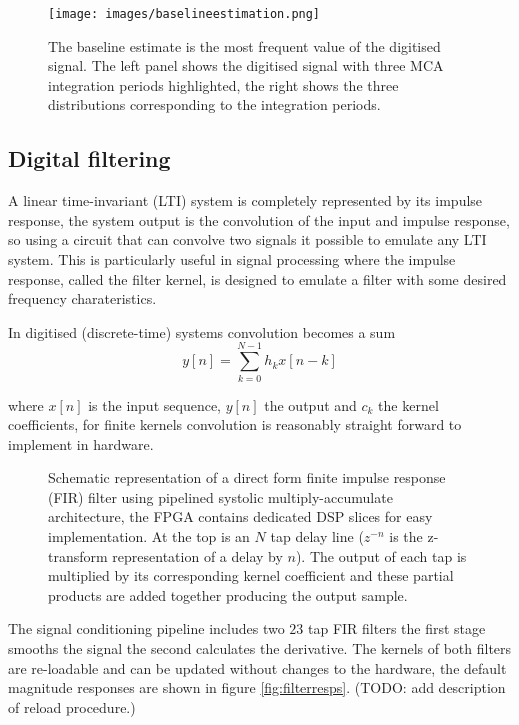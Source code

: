 \documentclass{article}
\begin{document}
\begin{figure}[!hpbt]
  \centering
  \texttt{[image: images/baselineestimation.png]}
  \caption{
    The baseline estimate is the most frequent value of the digitised signal.
    The left panel shows the digitised signal with three MCA integration periods
    highlighted, the right shows the three distributions corresponding to the
    integration periods.
  }
  \label{fig:baselineestimation}
\end{figure}

\clearpage

\subsection{Digital filtering}

A linear time-invariant (LTI) system is completely represented by its impulse
response, the system output is the convolution of the input and
impulse response, so using a circuit that can convolve two signals it possible
to emulate any LTI system. This is particularly useful in signal processing
where the impulse response, called the filter kernel, is designed to emulate a
filter with some desired frequency charateristics. 

In digitised (discrete-time) systems convolution becomes a sum
\begin{equation*}
  y[n]=\sum_{k=0}^{N-1}h_k x[n-k]
\end{equation*}
 
where $x[n]$ is the input sequence, $y[n]$ the output and $c_k$ the kernel
coefficients, for finite kernels convolution is reasonably straight
forward to implement in hardware.

\begin{figure}[!hpbt]
  \centering 
  
  \caption{
    Schematic representation of a direct form finite impulse response (FIR)
    filter using pipelined systolic multiply-accumulate architecture, the FPGA
    contains dedicated DSP slices for easy implementation.
    At the top is an $N$ tap delay line ($z^{-n}$ is the z-transform
    representation of a delay by $n$). The output of each tap is multiplied by
    its corresponding kernel coefficient and these partial products are added
    together producing the output sample. 
  }
  \label{fig:FIR}
\end{figure}

The signal conditioning pipeline includes two $23$ tap FIR filters the first
stage smooths the signal the second calculates the derivative. The kernels of
both filters are re-loadable and can be updated without changes to the
hardware, the default magnitude responses are shown in figure
\ref{fig:filterresps}. (TODO: add description of reload procedure.)
\end{document}

